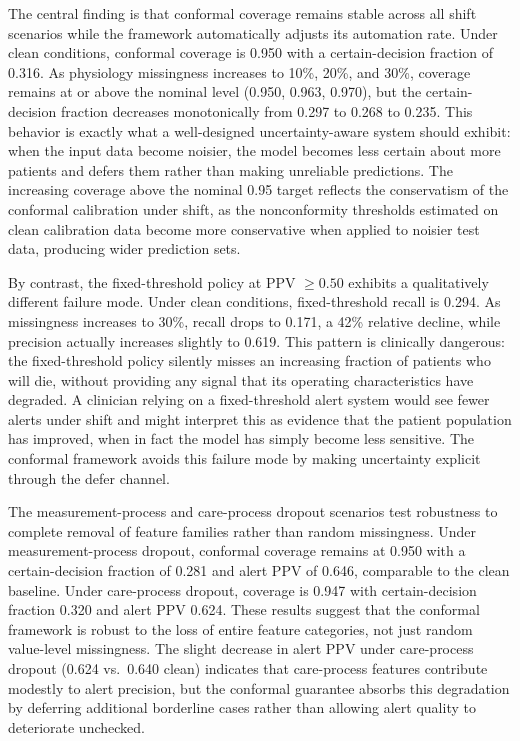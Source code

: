The central finding is that conformal coverage remains stable across all shift scenarios while the framework automatically adjusts its automation rate. Under clean conditions, conformal coverage is 0.950 with a certain-decision fraction of 0.316. As physiology missingness increases to 10\%, 20\%, and 30\%, coverage remains at or above the nominal level (0.950, 0.963, 0.970), but the certain-decision fraction decreases monotonically from 0.297 to 0.268 to 0.235. This behavior is exactly what a well-designed uncertainty-aware system should exhibit: when the input data become noisier, the model becomes less certain about more patients and defers them rather than making unreliable predictions. The increasing coverage above the nominal 0.95 target reflects the conservatism of the conformal calibration under shift, as the nonconformity thresholds estimated on clean calibration data become more conservative when applied to noisier test data, producing wider prediction sets.

By contrast, the fixed-threshold policy at PPV $\geq 0.50$ exhibits a qualitatively different failure mode. Under clean conditions, fixed-threshold recall is 0.294. As missingness increases to 30\%, recall drops to 0.171, a 42\% relative decline, while precision actually increases slightly to 0.619. This pattern is clinically dangerous: the fixed-threshold policy silently misses an increasing fraction of patients who will die, without providing any signal that its operating characteristics have degraded. A clinician relying on a fixed-threshold alert system would see fewer alerts under shift and might interpret this as evidence that the patient population has improved, when in fact the model has simply become less sensitive. The conformal framework avoids this failure mode by making uncertainty explicit through the defer channel.

The measurement-process and care-process dropout scenarios test robustness to complete removal of feature families rather than random missingness. Under measurement-process dropout, conformal coverage remains at 0.950 with a certain-decision fraction of 0.281 and alert PPV of 0.646, comparable to the clean baseline. Under care-process dropout, coverage is 0.947 with certain-decision fraction 0.320 and alert PPV 0.624. These results suggest that the conformal framework is robust to the loss of entire feature categories, not just random value-level missingness. The slight decrease in alert PPV under care-process dropout (0.624 vs.\ 0.640 clean) indicates that care-process features contribute modestly to alert precision, but the conformal guarantee absorbs this degradation by deferring additional borderline cases rather than allowing alert quality to deteriorate unchecked.


